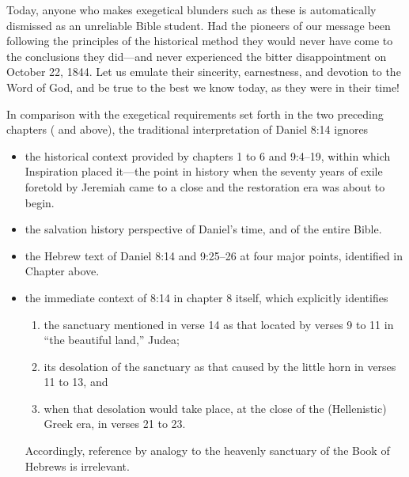 Today, anyone who makes exegetical blunders such as these is automatically
dismissed as an unreliable Bible student. Had the pioneers of our message
been following the principles of the historical method they would never have
come to the conclusions they did---and never experienced the bitter
disappointment on October 22, 1844. Let us emulate their sincerity,
earnestness, and devotion to the Word of God, and be true to the best we
know today, as they were in their time!

In comparison with the exegetical requirements set forth in the two
preceding chapters ( and  above), the 
traditional interpretation of Daniel 8:14 ignores
\begin{itemize}
	\item the historical context provided by chapters 1 to 6 and 9:4--19, within
which Inspiration placed it---the point in history when the seventy years of
exile foretold by Jeremiah came to a close and the restoration era was
about to begin.
	\item the salvation history perspective of Daniel's time, and of the entire
Bible.
	\item the Hebrew text of Daniel 8:14 and 9:25--26 at four major points,
identified in Chapter  above.
	\item the immediate context of 8:14 in chapter 8 itself, which explicitly
identifies
	\begin{enumerate}
		\item the sanctuary mentioned in verse 14 as that located by verses
9 to 11 in ``the beautiful land,'' Judea; 
		\item its desolation of the sanctuary
as that caused by the little horn in verses 11 to 13, and 
		\item when that
desolation would take place, at the close of the (Hellenistic) Greek era, in
verses 21 to 23.
	\end{enumerate}
	Accordingly, reference by analogy to the heavenly sanctuary
	of the Book of Hebrews is irrelevant.


\end{itemize}
